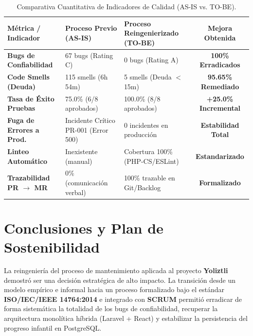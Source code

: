 \documentclass[12pt]{article}
\begin{document}
\begin{table}[H]
    \centering
    \caption{Comparativa Cuantitativa de Indicadores de Calidad (AS-IS vs. TO-BE).}
    \label{tab:results_comparison}
    \small
    \color{black}
    \begin{tabularx}{\textwidth}{XXXc}
        \toprule
        \textbf{Métrica / Indicador} & \textbf{Proceso Previo (AS-IS)} & \textbf{Proceso Reingenierizado (TO-BE)} & \textbf{Mejora Obtenida} \\
        \midrule
        \textbf{Bugs de Confiabilidad} & 67 bugs (Rating C) & 0 bugs (Rating A) & \textbf{100\% Erradicados} \\
        \rowcolor{darkcard}
        \textbf{Code Smells (Deuda)} & 115 smells (6h 54m) & 5 smells (Deuda $<$ 15m) & \textbf{95.65\% Remediado} \\
        \textbf{Tasa de Éxito Pruebas} & 75.0\% (6/8 aprobados) & 100.0\% (8/8 aprobados) & \textbf{+25.0\% Incremental} \\
        \rowcolor{darkcard}
        \textbf{Fuga de Errores a Prod.} & Incidente Crítico PR-001 (Error 500) & 0 incidentes en producción & \textbf{Estabilidad Total} \\
        \textbf{Linteo Automático} & Inexistente (manual) & Cobertura 100\% (PHP-CS/ESLint) & \textbf{Estandarizado} \\
        \rowcolor{darkcard}
        \textbf{Trazabilidad PR $\to$ MR} & 0\% (comunicación verbal) & 100\% trazable en Git/Backlog & \textbf{Formalizado} \\
        \bottomrule
    \end{tabularx}
\end{table}

\section{Conclusiones y Plan de Sostenibilidad}

La reingeniería del proceso de mantenimiento aplicada al proyecto \textbf{Yoliztli} demostró ser una decisión estratégica de alto impacto. La transición desde un modelo empírico e informal hacia un proceso formalizado bajo el estándar \textbf{ISO/IEC/IEEE 14764:2014} e integrado con \textbf{SCRUM} permitió erradicar de forma sistemática la totalidad de los bugs de confiabilidad, recuperar la arquitectura monolítica híbrida (Laravel + React) y estabilizar la persistencia del progreso infantil en PostgreSQL.
\end{document}
